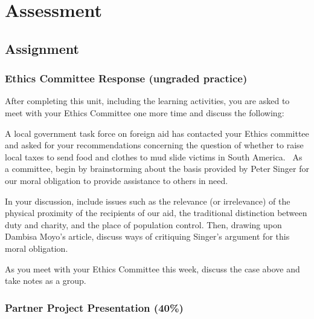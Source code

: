 \documentclass[
]{book}
\begin{document}
\hypertarget{assessment-9}{%
\section*{Assessment}\label{assessment-9}}

\begin{assessment}
\hypertarget{assignment-8}{%
\subsection*{Assignment}\label{assignment-8}}

\hypertarget{ethics-committee-response-ungraded-practice}{%
\subsubsection*{Ethics Committee Response (ungraded practice)}\label{ethics-committee-response-ungraded-practice}}

After completing this unit, including the learning activities, you are asked to
meet with your Ethics Committee one more time and discuss the following:

A local government task force on foreign aid has contacted your Ethics committee and asked for your recommendations concerning the question of whether to raise local taxes to send food and clothes to mud slide victims in South America. ~As a committee, begin by brainstorming about the basis provided by Peter Singer for our moral obligation to provide assistance to others in need.

In your discussion, include issues such as the relevance (or irrelevance) of the physical proximity of the recipients of our aid, the traditional distinction between duty and charity, and the place of population control. Then, drawing upon Dambisa Moyo's article, discuss ways of critiquing Singer's argument for this moral obligation.

As you meet with your Ethics Committee this week, discuss the case above and take notes as a group.

\hypertarget{partner-project-presentation-40}{%
\subsubsection*{Partner Project Presentation (40\%)}\label{partner-project-presentation-40}}


\end{assessment}
\end{document}
